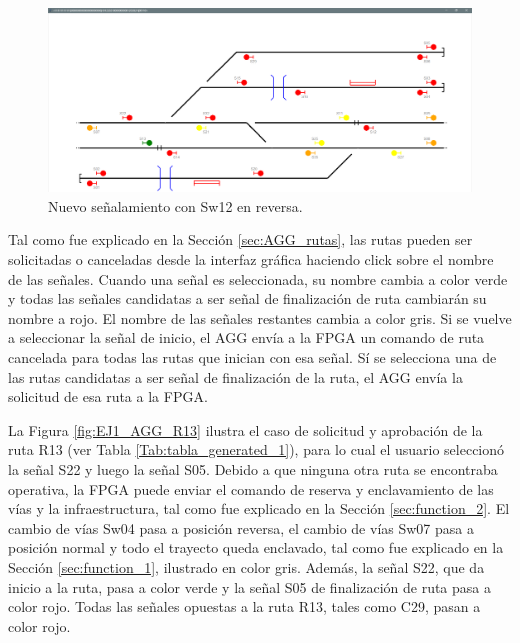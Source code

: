 	\begin{figure}[H]
		\centering
		\includegraphics[origin = c, width=1\textwidth]{resultados-obtenidos/ejemplo1/images/AGG_S32_NO}
		\centering\caption{Nuevo señalamiento con Sw12 en reversa.}
		\label{fig:EJ1_AGG_SW12_REVERSE}
	\end{figure}
	
	Tal como fue explicado en la Sección \ref{sec:AGG_rutas}, las rutas pueden ser solicitadas o canceladas desde la interfaz gráfica haciendo click sobre el nombre de las señales. Cuando una señal es seleccionada, su nombre cambia a color verde y todas las señales candidatas a ser señal de finalización de ruta cambiarán su nombre a rojo. El nombre de las señales restantes cambia a color gris. Si se vuelve a seleccionar la señal de inicio, el AGG envía a la FPGA un comando de ruta cancelada para todas las rutas que inician con esa señal. Sí se selecciona una de las rutas candidatas a ser señal de finalización de la ruta, el AGG envía la solicitud de esa ruta a la FPGA.
	
	La Figura \ref{fig:EJ1_AGG_R13}	ilustra el caso de solicitud y aprobación de la ruta R13 (ver Tabla \ref{Tab:tabla_generated_1}), para lo cual el usuario seleccionó la señal S22 y luego la señal S05. Debido a que ninguna otra ruta se encontraba operativa, la FPGA puede enviar el comando de reserva y enclavamiento de las vías y la infraestructura, tal como fue explicado en la Sección \ref{sec:function_2}. El cambio de vías Sw04 pasa a posición reversa, el cambio de vías Sw07 pasa a posición normal y todo el trayecto queda enclavado, tal como fue explicado en la Sección \ref{sec:function_1}, ilustrado en color gris. Además, la señal S22, que da inicio a la ruta, pasa a color verde y la señal S05 de finalización de ruta pasa a color rojo. Todas las señales opuestas a la ruta R13, tales como C29, pasan a color rojo. 
	
